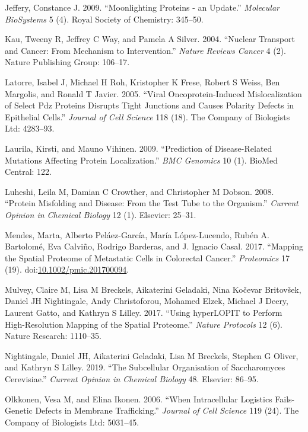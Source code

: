 \documentclass[]{article}
\begin{document}
\hypertarget{ref-Jeffery:2009}{}
Jeffery, Constance J. 2009. ``Moonlighting Proteins - an Update.''
\emph{Molecular BioSystems} 5 (4). Royal Society of Chemistry: 345--50.

\hypertarget{ref-Kau:2004}{}
Kau, Tweeny R, Jeffrey C Way, and Pamela A Silver. 2004. ``Nuclear
Transport and Cancer: From Mechanism to Intervention.'' \emph{Nature
Reviews Cancer} 4 (2). Nature Publishing Group: 106--17.

\hypertarget{ref-Latorre:2005}{}
Latorre, Isabel J, Michael H Roh, Kristopher K Frese, Robert S Weiss,
Ben Margolis, and Ronald T Javier. 2005. ``Viral Oncoprotein-Induced
Mislocalization of Select Pdz Proteins Disrupts Tight Junctions and
Causes Polarity Defects in Epithelial Cells.'' \emph{Journal of Cell
Science} 118 (18). The Company of Biologists Ltd: 4283--93.

\hypertarget{ref-Laurila:2009}{}
Laurila, Kirsti, and Mauno Vihinen. 2009. ``Prediction of
Disease-Related Mutations Affecting Protein Localization.'' \emph{BMC
Genomics} 10 (1). BioMed Central: 122.

\hypertarget{ref-Luheshi:2008}{}
Luheshi, Leila M, Damian C Crowther, and Christopher M Dobson. 2008.
``Protein Misfolding and Disease: From the Test Tube to the Organism.''
\emph{Current Opinion in Chemical Biology} 12 (1). Elsevier: 25--31.

\hypertarget{ref-Mendes:2017}{}
Mendes, Marta, Alberto Peláez-García, María López-Lucendo, Rubén A.
Bartolomé, Eva Calviño, Rodrigo Barderas, and J. Ignacio Casal. 2017.
``Mapping the Spatial Proteome of Metastatic Cells in Colorectal
Cancer.'' \emph{Proteomics} 17 (19).
doi:\href{https://doi.org/10.1002/pmic.201700094}{10.1002/pmic.201700094}.

\hypertarget{ref-Mulvey:2017}{}
Mulvey, Claire M, Lisa M Breckels, Aikaterini Geladaki, Nina Kočevar
Britovšek, Daniel JH Nightingale, Andy Christoforou, Mohamed Elzek,
Michael J Deery, Laurent Gatto, and Kathryn S Lilley. 2017. ``Using
hyperLOPIT to Perform High-Resolution Mapping of the Spatial Proteome.''
\emph{Nature Protocols} 12 (6). Nature Research: 1110--35.

\hypertarget{ref-Nightingale:2019}{}
Nightingale, Daniel JH, Aikaterini Geladaki, Lisa M Breckels, Stephen G
Oliver, and Kathryn S Lilley. 2019. ``The Subcellular Organisation of
Saccharomyces Cerevisiae.'' \emph{Current Opinion in Chemical Biology}
48. Elsevier: 86--95.

\hypertarget{ref-Olkkonen:2006}{}
Olkkonen, Vesa M, and Elina Ikonen. 2006. ``When Intracellular Logistics
Fails-Genetic Defects in Membrane Trafficking.'' \emph{Journal of Cell
Science} 119 (24). The Company of Biologists Ltd: 5031--45.
\end{document}
